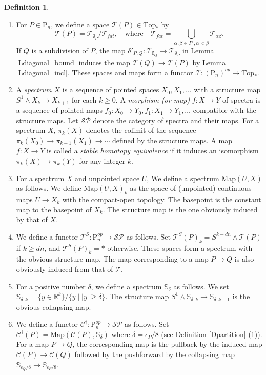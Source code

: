 \documentclass[reqno]{amsart}
\theoremstyle{definition}
\newtheorem{defi}{Definition}[section]
\theoremstyle{plain}
\newcommand{\eps}{\epsilon}
\newcommand{\TT}{\mathcal{T}} %
\newcommand{\Map}{\mathrm{Map}}
\newcommand{\SP}{\mathcal{SP}}
\newcommand{\CG}{\mathrm{Top}}%
\newcommand{\RR}{\mathbb{R}}
\newcommand{\Sphere}{\mathbb{S}}
\newcommand{\PP}{\mathrm{P}} %
\begin{document}
\begin{defi}\label{Dspectrafunctor}
\begin{enumerate}
\item For $P\in \PP_n$, we define a space $\TT(P)\in \CG_*$ by 
\[
\TT(P)=\TT_{\emptyset_P} / \TT_{fat},\quad \text{where} \quad \TT_{fat}=\bigcup_{\alpha,\beta \in P^\circ, \alpha<\beta}\TT_{\alpha\beta}.
\]
 If $Q$ is a subdivision of $P$, the map $\delta'_{P,Q}:\TT_{\emptyset_Q}\to \TT_{\emptyset_P}$ in Lemma \ref{Ldiagonal_bound} induces the map $\TT(Q)\to \TT(P)$ by Lemma \ref{Ldiagonal_incl}.  These spaces and maps form a functor $\TT:(\PP_n)^{op}\to \CG_*$. 
\item A {\em spectrum} $X$ is a sequence of pointed spaces $X_0, X_1, \dots$ with a  structure map $S^1\wedge X_k\to X_{k+1}$ for each $k\geq 0$. A {\em morphism (or map)} $f:X\to Y$ of spectra is a sequence of pointed maps $f_0:X_0\to Y_0, f_1:X_1\to Y_1,\dots$ compatible with the structure maps. Let $\SP$ denote the category of spectra and their maps. For a spectrum $X$,  $\pi_k(X)$ denotes the colimit of the sequence $\pi_k(X_0)\to \pi_{k+1}(X_1)\to \cdots $ defined by the structure maps. A map $f:X\to Y$ is called a {\em stable homotopy equivalence} if it induces an isomorphism $\pi_k(X)\to \pi_k(Y)$ for any integer $k$.
\item For a spectrum $X$ and unpointed space $U$, We define a spectrum $\Map(U,X)$ as follows. We define  $\Map(U,X)_k$ as the space  of (unpointed) continuous maps $U\to X_k$ with the compact-open topology. The basepoint is the constant map to the basepoint of $X_k$. The structure map is the one obviously induced by that of $X$.
\item We define a functor $\TT^S: \PP_n^{op}\to \SP$ as follows. Set $\TT^S(P)_k=S^{k-dn}\wedge \TT(P)$ if $k\geq dn$,  and $\TT^S(P)_k=*$ otherwise. These spaces form a spectrum with the obvious structure map. The map corresponding to a map $P\to Q$ is also obviously induced from that of $\TT$. 
\item For a positive number $\delta$, we define a spectrum $\Sphere_\delta$ as follows. We set $\Sphere_{\delta, k}=\{ y\in \RR^k\}/\{y \mid |y|\geq \delta\}$. The structure map $S^1\wedge \Sphere_{\delta, k}\to \Sphere_{\delta, k+1}$ is the obvious collapsing map.
\item We define a functor $\mathcal{C}^\dagger:\PP_n^{op}\to \SP$ as follows.
Set $\mathcal{C}^{\dagger}(P)=\Map(\mathcal{C}(P),\Sphere_{\delta})$ where  $\delta =\eps_P/8$ (see Definition \ref{Dpartition} (1)). For a map $P\to Q$, the corresponding map is the pullback by the induced map $\mathcal{C}(P)\to \mathcal{C}(Q)$ followed by the pushforward by the collapsing map $\Sphere_{\eps_Q/8}\to \Sphere_{\eps_P/8}$.


\end{enumerate}
\end{defi}
\end{document}

